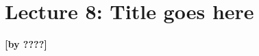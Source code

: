 
\section{Lecture 8: Title goes here}
\label{sec:lecture8}
\begin{flushright}\textbf{[by ????]}\end{flushright}

